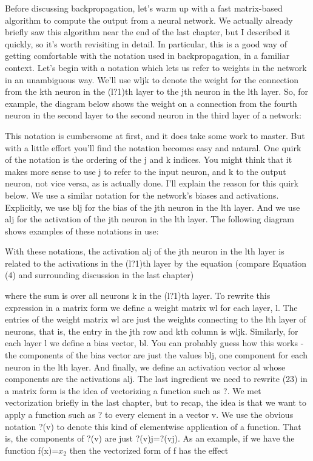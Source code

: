 Before discussing backpropagation, let's warm up with a fast matrix-based algorithm to compute the output from a neural network. We actually already briefly saw this algorithm near the end of the last chapter, but I described it quickly, so it's worth revisiting in detail. In particular, this is a good way of getting comfortable with the notation used in backpropagation, in a familiar context.
Let's begin with a notation which lets us refer to weights in the network in an unambiguous way. We'll use wljk to denote the weight for the connection from the kth neuron in the (l?1)th layer to the jth neuron in the lth layer. So, for example, the diagram below shows the weight on a connection from the fourth neuron in the second layer to the second neuron in the third layer of a network: 

This notation is cumbersome at first, and it does take some work to master. But with a little effort you'll find the notation becomes easy and natural. One quirk of the notation is the ordering of the j and k indices. You might think that it makes more sense to use j to refer to the input neuron, and k to the output neuron, not vice versa, as is actually done. I'll explain the reason for this quirk below.
We use a similar notation for the network's biases and activations. Explicitly, we use blj for the bias of the jth neuron in the lth layer. And we use alj for the activation of the jth neuron in the lth layer. The following diagram shows examples of these notations in use: 

With these notations, the activation alj of the jth neuron in the lth layer is related to the activations in the (l?1)th layer by the equation (compare Equation (4) and surrounding discussion in the last chapter) 

where the sum is over all neurons k in the (l?1)th layer. To rewrite this expression in a matrix form we define a weight matrix wl for each layer, l. The entries of the weight matrix wl are just the weights connecting to the lth layer of neurons, that is, the entry in the jth row and kth column is wljk. Similarly, for each layer l we define a bias vector, bl. You can probably guess how this works - the components of the bias vector are just the values blj, one component for each neuron in the lth layer. And finally, we define an activation vector al whose components are the activations alj.
The last ingredient we need to rewrite (23) in a matrix form is the idea of vectorizing a function such as ?. We met vectorization briefly in the last chapter, but to recap, the idea is that we want to apply a function such as ? to every element in a vector v. We use the obvious notation ?(v) to denote this kind of elementwise application of a function. That is, the components of ?(v) are just ?(v)j=?(vj). As an example, if we have the function f(x)=$x_2$ then the vectorized form of f has the effect 


